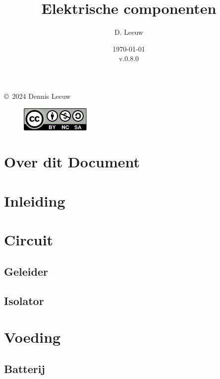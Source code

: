 \documentclass[a4paper,12pt,twoside,openright,titlepage]{book}
\author{D. Leeuw}
\title{Elektrische componenten}
\date{\today\\v.0.8.0}
\begin{document}

\maketitle

\copyright\ 2024 Dennis Leeuw\\

\begin{figure}
\includegraphics[width=0.3\textwidth]{CC-BY-SA-NC.png}
\end{figure}

\bigskip




\frontmatter
\chapter{Over dit Document}



\tableofcontents

\mainmatter
\chapter{Inleiding}


\chapter{Circuit}

\section{Geleider}

\section{Isolator}


\chapter{Voeding}
\section{Batterij}

\end{document}
